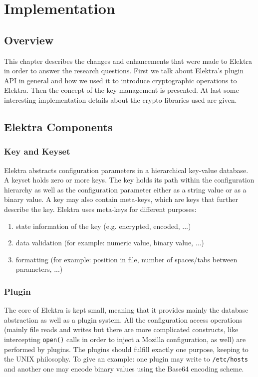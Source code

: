 \chapter{Implementation}

\section{Overview}

This chapter describes the changes and enhancements that were made to
Elektra in order to answer the research questions.
First we talk about Elektra's plugin API in general and how we used it
to introduce cryptographic operations to Elektra. Then the concept of
the key management is presented. At last some interesting implementation
details about the crypto libraries used are given.

\section{Elektra Components}\label{elektra-plugins}

\subsection{Key and Keyset}

Elektra abstracts configuration parameters in a hierarchical key-value database.
A keyset holds zero or more keys.
The key holds its path within the configuration hierarchy as well as the configuration parameter either as a string value or as a binary value.
A key may also contain meta-keys, which are keys that further describe the key.
Elektra uses meta-keys for different purposes:

\begin{enumerate}
\item state information of the key (e.g. encrypted, encoded, ...)
\item data validation (for example: numeric value, binary value, ...)
\item formatting (for example: position in file, number of spaces/tabs between parameters, ...)
\end{enumerate}

\subsection{Plugin}

The core of Elektra is kept small, meaning that it provides mainly the database abstraction as well as a plugin system.
All the configuration access operations (mainly file reads and writes but there are more complicated constructs, like intercepting \texttt{open()} calls in order to inject a Mozilla configuration, as well) are performed by plugins.
The plugins should fulfill exactly one purpose, keeping to the UNIX philosophy.
To give an example: one plugin may write to \texttt{/etc/hosts} and another one may encode binary values using the Base64 encoding scheme.

